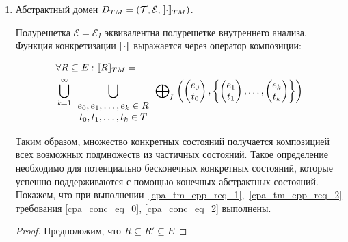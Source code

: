 \begin{enumerate}

\item Абстрактный домен $D_{TM}=(\mathcal{T}, \mathcal{E}, [\![ \cdot ]\!]_{TM})$.

Полурешетка $\mathcal{E}=\mathcal{E}_I$ эквивалентна полурешетке внутреннего анализа.
Функция конкретизации $[\![ \cdot ]\!]$ выражается через оператор композиции:

\begin{equation}
\label{cpa_conc_tm_def}
\begin{aligned}
& \forall R \subseteq E: [\![ R ]\!]_{TM} = \\ & \bigcup_{k=1}^{\infty}{ 
\bigcup_{
\begin{array}{c}
e_0, e_1,\dots,e_k \in R \\
t_0, t_1,\dots,t_k \in T
\end{array}
} {
\mathrel{\bigoplus}_I
\left(
\begin{pmatrix}
e_0 \\
t_0 
\end{pmatrix},
\left\{
\begin{pmatrix}
e_1 \\
t_1 
\end{pmatrix},
\dots ,
\begin{pmatrix}
e_k \\
t_k 
\end{pmatrix}
\right\}
\right)
}
}
\end{aligned}
\end{equation}

Таким образом, множество конкретных состояний получается композицией всех возможных подмножеств из частичных состояний.
Такое определение необходимо для потенциально бесконечных конкретных состояний, которые успешно поддерживаются с помощью конечных абстрактных состояний.
Покажем, что при выполнении~\ref{cpa_tm_epp_req_1},~\ref{cpa_tm_epp_req_2} требования \ref{cpa_conc_eq_0}, \ref{cpa_conc_eq_2} выполнены.

\begin{proof}

Предположим, что $R \subseteq R' \subseteq E$


\end{proof}
\end{enumerate}
